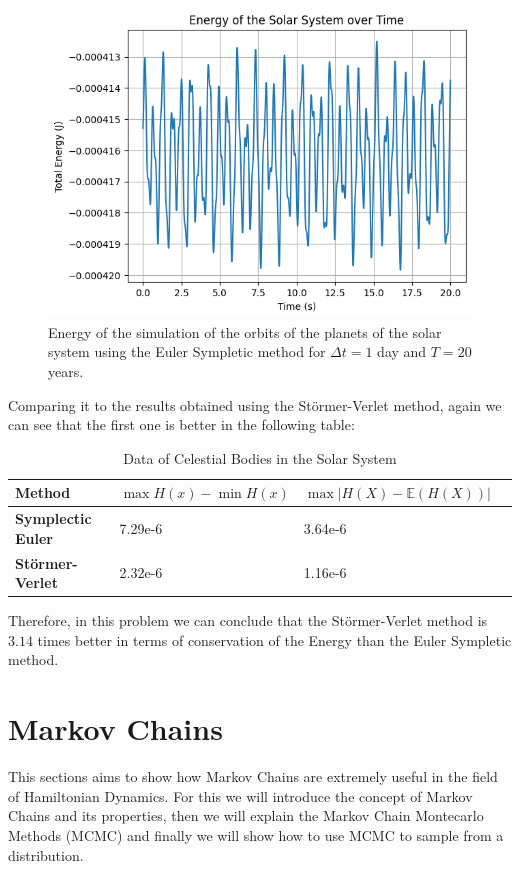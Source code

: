 \documentclass{article}
\begin{document}
\begin{figure}[H]
	\centering
	\includegraphics[width=0.5\linewidth]{./Figures/SolarSystem/energy_euler.png}
	\caption{Energy of the simulation of the orbits of the planets of the solar system using the Euler Sympletic method for \(\Delta t = 1\) day and \(T = 20\) years.}
	\label{fig:solarsystemenergyeuler}
\end{figure}

Comparing it to the results obtained using the Störmer-Verlet method, again we can see that the first one is better in the following table:

\begin{table}[H]
	\centering
	\renewcommand{\arraystretch}{1.2} %
	\begin{tabular}{>{\bfseries}l >{\raggedleft}p{4cm} >{\raggedleft\arraybackslash}p{4cm} >{\raggedleft\arraybackslash}p{3cm}}
	\toprule
	\textbf{Method} & $\max{H(x)} - \min{H(x)}$  & $\max{|H(X) - \mathbb{E}(H(X))|}$\\
	\midrule
	Symplectic Euler & 7.29e-6 & 3.64e-6  \\
	Störmer-Verlet   & 2.32e-6 & 1.16e-6 \\
	\bottomrule
	\end{tabular}
	\caption{Data of Celestial Bodies in the Solar System}
	\label{table:comparison}
\end{table}

Therefore, in this problem we can conclude that the Störmer-Verlet method is $3.14$ times better in terms of conservation of the Energy than the Euler Sympletic method.

\section{Markov Chains}
\label{sec:markov_chains}

This sections aims to show how Markov Chains are extremely useful in the field of Hamiltonian Dynamics. For this we will introduce the concept of Markov Chains and its properties, then we will explain the Markov Chain Montecarlo Methods (MCMC) and finally we will show how to use MCMC to sample from a distribution.
\end{document}
